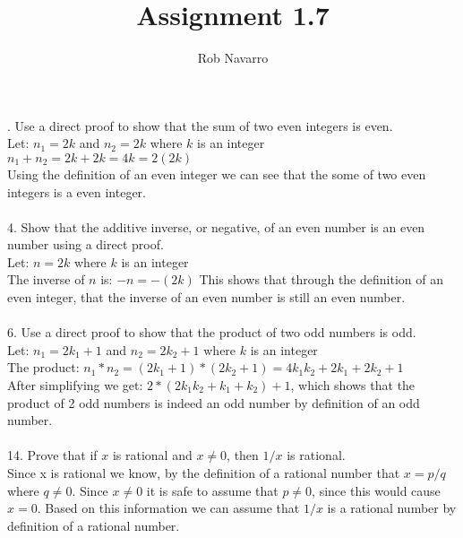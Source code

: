\documentclass[11pt, oneside]{article}   	%
\title{Assignment 1.7}
\author{Rob Navarro}
\begin{document}
\maketitle

. Use a direct proof to show that the sum of two even integers is even. \\
Let: $n_1 = 2k$ and $n_2 = 2k$ where $k$ is an integer\\
$n_1 + n_2 = 2k + 2k = 4k = 2(2k)$\\
Using the definition of an even integer we can see that the some of two even integers is a even integer.\\\\
4. Show that the additive inverse, or negative, of an even number is an even number using a direct proof.  \\
Let: $n = 2k$ where $k$ is an integer\\
The inverse of $n$ is: $-n = -(2k)$
This shows that through the definition of an even integer, that the inverse of an even number is still an even number. \\\\
6. Use a direct proof to show that the product of two odd numbers is odd.\\
Let: $n_1 = 2k_1 + 1 $ and $n_2 = 2k_2 + 1$ where $k$ is an integer\\
The product: $n_1 * n_2 = (2k_1+1) * (2k_2+1) = 4k_1k_2 + 2k_1 + 2k_2 + 1 $\\
After simplifying we get: $2 * (2k_1k_2 + k_1 + k_2) + 1$, which shows that the product of 2 odd numbers is indeed an odd number by definition of an odd number. \\\\
14. Prove that if $x$ is rational and $x\neq 0$, then $1/x$ is rational. \\
Since x is rational we know, by the definition of a rational number that $x = p/q$ where $q\neq 0$. Since $x\neq 0$ it is safe to assume that $p\neq 0$, since this would cause $x=0$. Based on this information we can assume that $1/x$ is a rational number by definition of a rational number. \\\\
\end{document}
